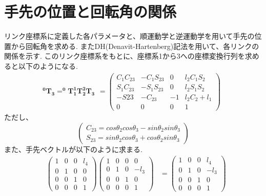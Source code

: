   \section{手先の位置と回転角の関係}
  	\label{chap:kinetic}
	リンク座標系に定義した各パラメータと、順運動学と逆運動学を用いて手先の位置から回転角を求める. またDH(Denavit-Hartenberg)記法を用いて、各リンクの関係を示す.
	このリンク座標系をもとに、座標系1から3への座標変換行列を求めると以下のようになる.
	\begin{equation}
		\boldsymbol{ ^{0}T_{3}=^{0}T_{1} ^{1}T_{2} ^{2}T_{3} }
		\begin{array}{cc}
			=
			\left(
				\begin{array}{cccc}
					C_1C_{23} & -C_1S_{23} & 0 & l_2C_1S_2 \\
					S_1C_{23} & -S_1S_{23} & 0 & l_2S_1S_2 \\
					-S{23} & -C_{23} & -1 & l_2C_2 + l_1 \\
					0 & 0 & 0 & 1
				\end{array}
			\right)
		\end{array}
	\end{equation}
	ただし、
	\begin{equation*}
		\left(
		\begin{split}
			C_{23} = cos\theta_2cos\theta_3-sin\theta_2sin\theta_3\\
			S_{23} = sin\theta_2cos\theta_3+cos\theta_2sin\theta_3
		\end{split}
		\right)
	\end{equation*}
    また、手先ベクトルが以下のように求まる.
	\begin{equation}
	\begin{array}{cccc}
		&\left(
			\begin{array}{cccc}
				1 & 0 & 0 & l_4\\
				0 & 1 & 0 & 0\\
				0 & 0 & 1 & 0\\
				0 & 0 & 0 & 1
			\end{array}
		\right)
		\left(
			\begin{array}{cccc}
				1 & 0 & 0 & 0\\
				0 & 1 & 0 & -l_3\\
				0 & 0 & 1 & 0\\
				0 & 0 & 0 & 1
			\end{array}
			\right)
		&=
		\left(
		\begin{array}{cccc}
			1 & 0 & 0 & l_4\\
			0 & 1 & 0 & -l_3\\
			0 & 0 & 1 & 0\\
			0 & 0 & 0 & 1
		\end{array}
		\right)
	\end{array}
	\end{equation}

